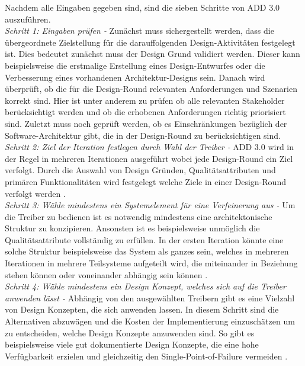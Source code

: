 Nachdem alle Eingaben gegeben sind, sind die sieben Schritte von ADD 3.0 auszuf\"uhren.\\

\emph{Schritt 1: Eingaben pr\"ufen -}
Zun\"achst muss sichergestellt werden, dass die \"ubergeordnete Zielstellung f\"ur die darauffolgenden Design-Aktivit\"aten festgelegt ist. Dies bedeutet zun\"achst muss der Design Grund validiert werden. Dieser kann beispielsweise die erstmalige Erstellung eines Design-Entwurfes oder die Verbesserung eines vorhandenen Architektur-Designs sein. Danach wird \"uberpr\"uft, ob die f\"ur die Design-Round relevanten Anforderungen und Szenarien korrekt sind. Hier ist unter anderem zu pr\"ufen ob alle relevanten Stakeholder ber\"ucksichtigt werden und ob die erhobenen Anforderungen richtig priorisiert sind. Zuletzt muss noch gepr\"uft werden, ob es Einschr\"ankungen bez\"uglich der Software-Architektur gibt, die in der Design-Round zu ber\"ucksichtigen sind.\\

\emph{Schritt 2: Ziel der Iteration festlegen durch Wahl der Treiber -}
ADD 3.0 wird in der Regel in mehreren Iterationen ausgef\"uhrt wobei jede Design-Round ein Ziel verfolgt. Durch die Auswahl von Design Gr\"unden, Qualit\"atsattributen und prim\"aren Funktionalit\"aten wird festgelegt welche Ziele in einer Design-Round verfolgt werden \cite{Cer01}.\\

\emph{Schritt 3: W\"ahle mindestens ein Systemelement f\"ur eine Verfeinerung aus -}
Um die Treiber zu bedienen ist es notwendig mindestens eine architektonische Struktur zu konzipieren. Ansonsten ist es beispielsweise unm\"oglich die Qualit\"atsattribute vollst\"andig zu erf\"ullen. In der ersten Iteration k\"onnte eine solche Struktur beispielsweise das System als ganzes sein, welches in mehreren Iterationen in mehrere Teilsysteme aufgeteilt wird, die miteinander in Beziehung stehen k\"onnen oder voneinander abh\"angig sein k\"onnen \cite{Cer01}.\\

\emph{Schritt 4: W\"ahle mindestens ein Design Konzept, welches sich auf die Treiber anwenden l\"asst -}
Abh\"angig von den ausgew\"ahlten Treibern gibt es eine Vielzahl von Design Konzepten, die sich anwenden lassen. In diesem Schritt sind die Alternativen abzuw\"agen und die Kosten der Implementierung einzusch\"atzen um zu entscheiden, welche Design Konzepte anzuwenden sind. So gibt es beispielsweise viele gut dokumentierte Design Konzepte, die eine hohe Verf\"ugbarkeit erzielen und gleichzeitig den Single-Point-of-Failure vermeiden \cite{Cer01}.\\

